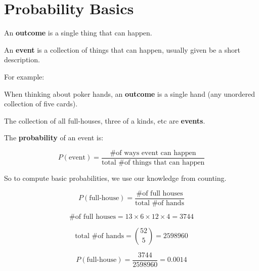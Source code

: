 \section{Probability Basics}

%
\begin{frame}

An \textbf{outcome} is a single thing that can happen.

An \textbf{event} is a collection of things that can happen, usually given be a
short description.

\end{frame}
%

%
\begin{frame}

For example:

When thinking about poker hands, an \textbf{outcome} is a single hand (any
unordered collection of five cards).

The collection of all full-houses, three of a kinds, etc are \textbf{events}.

\end{frame}


%
\begin{frame}

The \textbf{probability} of an event is:

$$ P(\text{event}) = \frac{\text{\# of ways event can happen}}{\text{total \# of
things that can happen}} $$

So to compute basic probabilities, we use our knowledge from counting.

\end{frame}
%

%
\begin{frame}

$$ P(\text{full-house}) = \frac{\text{\# of full houses}}{\text{total \# of
hands}} $$

\end{frame}
%

%
\begin{frame}

$$ \text{\# of full houses} = 13 \times 6 \times 12 \times 4 = 3744 $$

$$ \text{total \# of hands} = {{52}\choose{5}} = 2598960 $$

\end{frame}
%

%
\begin{frame}

$$ P(\text{full-house}) = \frac{3744}{2598960} = 0.0014 $$

\end{frame}
